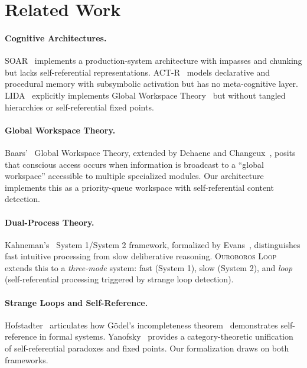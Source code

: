 \documentclass[11pt,a4paper]{article}
\newcommand{\OL}{\textsc{Ouroboros Loop}}
\begin{document}
\section{Related Work}
\label{sec:related}

\paragraph{Cognitive Architectures.}
SOAR~\citep{laird1987soar} implements a production-system architecture
with impasses and chunking but lacks self-referential representations.
ACT-R~\citep{anderson2004act} models declarative and procedural memory
with subsymbolic activation but has no meta-cognitive layer.
LIDA~\citep{franklin2014lida} explicitly implements Global Workspace
Theory~\citep{baars1988cognitive, baars2005gwt} but without tangled
hierarchies or self-referential fixed points.

\paragraph{Global Workspace Theory.}
Baars'~\citep{baars1988cognitive} Global Workspace Theory, extended by
Dehaene and Changeux~\citep{dehaene2011gwt}, posits that conscious
access occurs when information is broadcast to a ``global workspace''
accessible to multiple specialized modules. Our architecture implements
this as a priority-queue workspace with self-referential content
detection.

\paragraph{Dual-Process Theory.}
Kahneman's~\citep{kahneman2011thinking} System 1/System 2 framework,
formalized by Evans~\citep{evans2008dual}, distinguishes fast intuitive
processing from slow deliberative reasoning. \OL{} extends this to a
\emph{three-mode} system: fast (System 1), slow (System 2), and
\emph{loop} (self-referential processing triggered by strange loop
detection).

\paragraph{Strange Loops and Self-Reference.}
Hofstadter~\citep{hofstadter1979geb, hofstadter2007loop} articulates
how G\"odel's incompleteness theorem~\citep{godel1931undecidable}
demonstrates self-reference in formal systems. Yanofsky~\citep{yanofsky2003fixed}
provides a category-theoretic unification of self-referential paradoxes
and fixed points. Our formalization draws on both frameworks.
\end{document}

